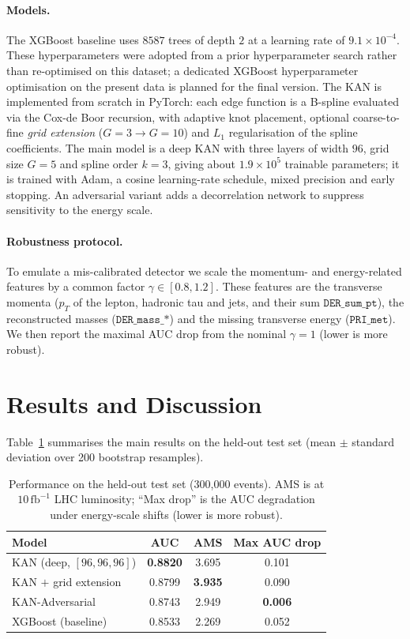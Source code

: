 \documentclass[11pt]{article}
\begin{document}
\paragraph{Models.} The XGBoost baseline uses $8587$ trees of depth $2$ at a learning rate of
$9.1\times10^{-4}$. These hyperparameters were adopted from a prior hyperparameter search
rather than re-optimised on this dataset; a dedicated XGBoost hyperparameter optimisation on
the present data is planned for the final version. The KAN is implemented from scratch in
PyTorch: each edge function is a B-spline evaluated via the Cox-de Boor recursion, with
adaptive knot placement, optional coarse-to-fine \emph{grid extension} ($G{=}3\rightarrow
G{=}10$) and $L_1$ regularisation of the spline coefficients. The main model is a deep KAN with
three layers of width $96$, grid size $G{=}5$ and spline order $k{=}3$, giving about
$1.9\times10^{5}$ trainable parameters; it is trained with Adam, a cosine learning-rate
schedule, mixed precision and early stopping. An adversarial variant adds a decorrelation
network to suppress sensitivity to the energy scale.

\paragraph{Robustness protocol.} To emulate a mis-calibrated detector we scale the
momentum- and energy-related features by a common factor $\gamma\in[0.8,1.2]$. These features
are the transverse momenta ($p_T$ of the lepton, hadronic tau and jets, and their sum
$\texttt{DER\_sum\_pt}$), the reconstructed masses ($\texttt{DER\_mass\_*}$) and the missing
transverse energy ($\texttt{PRI\_met}$). We then report the maximal AUC drop from the nominal
$\gamma=1$ (lower is more robust).

\section{Results and Discussion}
Table~\ref{tab:results} summarises the main results on the held-out test set
(mean $\pm$ standard deviation over 200 bootstrap resamples).

\begin{table}[h]
\centering
\caption{Performance on the held-out test set (300{,}000 events). AMS is at $10\,\mathrm{fb}^{-1}$
LHC luminosity; ``Max drop'' is the AUC degradation under energy-scale shifts (lower is more robust).}
\label{tab:results}
\begin{tabular}{lccc}
\toprule
\textbf{Model} & \textbf{AUC} & \textbf{AMS} & \textbf{Max AUC drop} \\
\midrule
KAN (deep, $[96,96,96]$)      & \textbf{0.8820} & 3.695 & 0.101 \\
KAN $+$ grid extension        & 0.8799 & \textbf{3.935} & 0.090 \\
KAN-Adversarial               & 0.8743 & 2.949 & \textbf{0.006} \\
XGBoost (baseline)            & 0.8533 & 2.269 & 0.052 \\
\bottomrule
\end{tabular}
\end{table}
\end{document}
